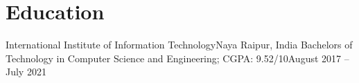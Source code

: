 \section{Education}
  \resumeSubHeadingListStart
    \resumeSubheading
      {International Institute of Information Technology}{Naya Raipur, India}
      {Bachelors of Technology in Computer Science and Engineering;  CGPA: 9.52/10}{August 2017 -- July 2021}
  \resumeSubHeadingListEnd